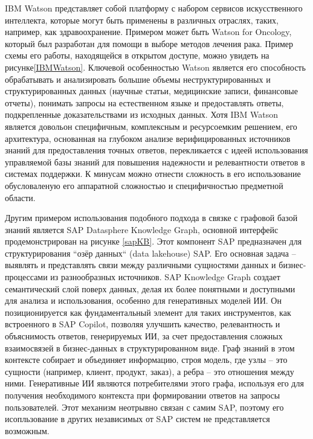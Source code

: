 IBM Watson\cite{watson} представляет собой платформу с набором сервисов искусственного интеллекта, которые могут быть применены в различных отраслях, таких, например, как здравоохранение. Примером может быть Watson for Oncology\cite{watsonO}, который был разработан для помощи в выборе методов лечения рака. Пример схемы его работы, находящейся в открытом доступе, можно увидеть на рисунке\ref{IBMWatson}. Ключевой особенностью Watson является его способность обрабатывать и анализировать большие объемы неструктурированных и структурированных данных (научные статьи, медицинские записи, финансовые отчеты), понимать запросы на естественном языке и предоставлять ответы, подкрепленные доказательствами из исходных данных. Хотя IBM Watson является довольон специфичным, комплексным и ресурсоемким решением, его архитектура, основанная на глубоком анализе верифицированных источников знаний для предоставления точных ответов, перекликается с идеей использования управляемой базы знаний для повышения надежности и релевантности ответов в системах поддержки. К минусам можно отнести сложность в его использование обусловаленую его аппаратной сложностью и специфичностью предметной области.


Другим примером использования подобного подхода в связке с графовой базой знаний является SAP Datasphere Knowledge Graph\cite{sapkb}, основной интерфейс продемонстрирован на рисунке \ref{sapKB}. Этот компонент SAP предназначен для структурирования ``озёр данных`` (data lakehouse) SAP. Его основная задача – выявлять и представлять связи между различными сущностями данных и бизнес-процессами из разнообразных источников. SAP Knowledge Graph создает семантический слой поверх данных, делая их более понятными и доступными для анализа и использования, особенно для генеративных моделей ИИ. Он позиционируется как фундаментальный элемент для таких инструментов, как встроенного в SAP Copilot, позволяя улучшить качество, релевантность и объяснимость ответов, генерируемых ИИ, за счет предоставления сложных взаимосвязей в бизнес-данных в структурированном виде. Граф знаний в этом контексте собирает и объединяет информацию, строя модель, где узлы – это сущности (например, клиент, продукт, заказ), а ребра – это отношения между ними. Генеративные ИИ являются потребителями этого графа, используя его для получения необходимого контекста при формировании ответов на запросы пользователей. Этот механизм неотрывно связан с самим SAP, поэтому его исопльзование в других независимых от SAP систем не представляется возможным.

